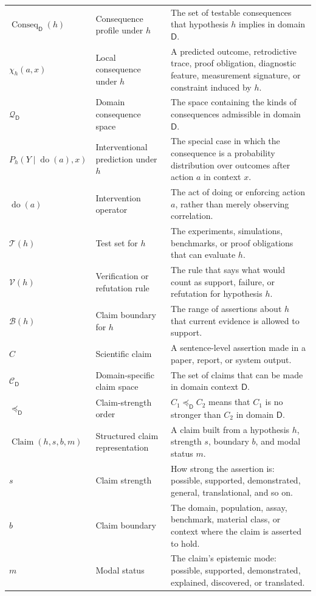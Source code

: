 \documentclass[11pt,a4paper]{article}
\newcommand{\doop}{\operatorname{do}}
\newcommand{\Conseq}{\operatorname{Conseq}}
\newcommand{\Claim}{\operatorname{Claim}}
\newcommand{\Dom}{\mathsf{D}}
\begin{document}
{\begin{longtable}{@{}p{2.8cm}p{4.1cm}p{6.4cm}@{}}
$\Conseq_{\Dom}(h)$ & Consequence profile under $h$ & The set of testable consequences that hypothesis $h$ implies in domain $\Dom$. \\
$\chi_h(a,x)$ & Local consequence under $h$ & A predicted outcome, retrodictive trace, proof obligation, diagnostic feature, measurement signature, or constraint induced by $h$. \\
$\mathcal{Q}_{\Dom}$ & Domain consequence space & The space containing the kinds of consequences admissible in domain $\Dom$. \\
$P_h(Y\mid \doop(a),x)$ & Interventional prediction under $h$ & The special case in which the consequence is a probability distribution over outcomes after action $a$ in context $x$. \\
$\doop(a)$ & Intervention operator & The act of doing or enforcing action $a$, rather than merely observing correlation. \\
$\mathcal{T}(h)$ & Test set for $h$ & The experiments, simulations, benchmarks, or proof obligations that can evaluate $h$. \\
$\mathcal{V}(h)$ & Verification or refutation rule & The rule that says what would count as support, failure, or refutation for hypothesis $h$. \\
$\mathcal{B}(h)$ & Claim boundary for $h$ & The range of assertions about $h$ that current evidence is allowed to support. \\
$C$ & Scientific claim & A sentence-level assertion made in a paper, report, or system output. \\
$\mathcal{C}_{\Dom}$ & Domain-specific claim space & The set of claims that can be made in domain context $\Dom$. \\
$\preceq_{\Dom}$ & Claim-strength order & $C_1\preceq_{\Dom} C_2$ means that $C_1$ is no stronger than $C_2$ in domain $\Dom$. \\
$\Claim(h,s,b,m)$ & Structured claim representation & A claim built from a hypothesis $h$, strength $s$, boundary $b$, and modal status $m$. \\
$s$ & Claim strength & How strong the assertion is: possible, supported, demonstrated, general, translational, and so on. \\
$b$ & Claim boundary & The domain, population, assay, benchmark, material class, or context where the claim is asserted to hold. \\
$m$ & Modal status & The claim's epistemic mode: possible, supported, demonstrated, explained, discovered, or translated. \\

\end{longtable}}
\end{document}
